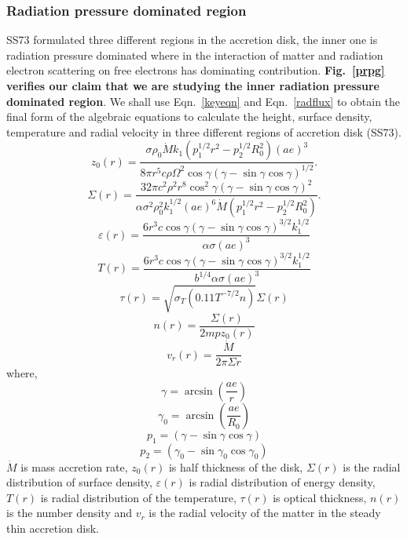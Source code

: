 \documentclass[useAMS,usenatbib]{mn2e}
\begin{document}
\subsubsection{Radiation pressure dominated region}
SS73 formulated three different regions in the accretion disk, the inner one is radiation pressure dominated where in the interaction of matter and radiation electron scattering on free electrons has dominating contribution. \textbf{Fig.~\ref{prpg} verifies our claim that we are studying the inner radiation pressure dominated region}. We shall use Eqn.~\ref{keyeqn} and Eqn.~\ref{radflux} to obtain the final form of the algebraic equations to calculate the height, surface density, temperature and radial velocity in three different regions of accretion disk (SS73).
\begin{equation}
z_0(r) = \frac{\sigma\rho_0\dot{M}k_1\left(p_1^{1/2}r^2 - p_2^{1/2}R_0^2\right)(ae)^3}{8\pi r^5 c \rho \Omega^2\cos\gamma(\gamma - \sin\gamma\cos\gamma)^{1/2}}.
\end{equation}
\begin{equation}
\Sigma(r) = \frac{32\pi c^2\rho^2 r^8 \cos^2{\gamma}(\gamma - \sin\gamma\cos\gamma)^2}{\alpha\sigma^2\rho_0^2 k_1^{1/2}(ae)^6\dot{M}\left(p_1^{1/2}r^2 - p_2^{1/2}R_0^2\right)}.
\end{equation}
\begin{equation}
\varepsilon(r) = \frac{6 r^3 c \cos\gamma(\gamma - \sin\gamma\cos\gamma)^{3/2}k_1^{1/2}}{\alpha\sigma (ae)^3}
\end{equation}
\begin{equation}
T(r) = \frac{6r^3 c \cos\gamma (\gamma - \sin\gamma\cos\gamma)^{3/2}k_1^{1/2}}{b^{1/4}\alpha\sigma (ae)^3}
\end{equation}
\begin{equation}
\tau (r) = \sqrt{\sigma_T(0.11 T^{-7/2}n)}\Sigma(r)
\end{equation}
\begin{equation}
n(r) = \frac{\Sigma(r)}{2mpz_0(r)}
\end{equation}
\begin{equation}
v_r(r) = \frac{\dot{M}}{2\pi\Sigma r}
\end{equation}
where, 
\begin{equation} 
\gamma = \arcsin(\frac{ae}{r}) 
\end{equation}
\begin{equation}
\gamma_0 = \arcsin(\frac{ae}{R_0})
\end{equation}
\begin{equation}
p_1 = (\gamma - \sin\gamma\cos\gamma)
\end{equation}
\begin{equation}
p_2 = (\gamma_0 - \sin\gamma_0\cos\gamma_0)
\end{equation}
$\dot{M}$ is mass accretion rate, $z_0(r)$ is half thickness of the disk, $\Sigma(r)$ is the radial distribution of surface density, $\varepsilon(r)$ is radial distribution of energy density, $T(r)$ is radial distribution of the temperature, $\tau(r)$ is optical thickness, $n(r)$ is the number density and $v_r$ is the radial velocity of the matter in the steady thin accretion disk.
\end{document}
